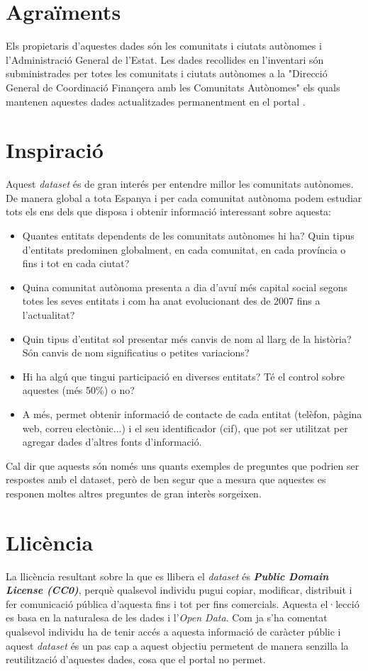 \documentclass[12pt]{article}
\begin{document}
\section*{Agraïments}
Els propietaris d'aquestes dades són les comunitats i ciutats autònomes i l'Administració General de l'Estat. Les dades recollides en l'inventari són subministrades per totes les comunitats i ciutats autònomes a la "Direcció General de Coordinació Finançera amb les Comunitats Autònomes" els quals mantenen aquestes dades actualitzades permanentment en el portal \cite{PDFAjuda}.

\section*{Inspiració}
Aquest \textit{dataset} és de gran interés per entendre millor les comunitats autònomes. De manera global a tota Espanya i per cada comunitat autònoma podem estudiar tots els ens dels que disposa i obtenir informació interessant sobre aquesta:
\begin{itemize}
    \item Quantes entitats dependents de les comunitats autònomes hi ha? Quin tipus d'entitats predominen globalment, en cada comunitat, en cada província o fins i tot en cada ciutat?
    \item Quina comunitat autònoma presenta a dia d'avuí més capital social segons totes les seves entitats i com ha anat evolucionant des de 2007 fins a l'actualitat?
    \item Quin tipus d'entitat sol presentar més canvis de nom al llarg de la història? Són canvis de nom significatius o petites variacions?
    \item Hi ha algú que tingui participació en diverses entitats? Té el control sobre aquestes (més 50\%) o no?
    \item A més, permet obtenir informació de contacte de cada entitat (telèfon, pàgina web, correu electònic...) i el seu identificador (cif), que pot ser utilitzat per agregar dades d'altres fonts d'informació.
\end{itemize}

Cal dir que aquests són només uns quants exemples de preguntes que podrien ser respostes amb el dataset, però de ben segur que a mesura que aquestes es responen moltes altres preguntes de gran interès sorgeixen.


\section*{Llicència}
La llicència resultant sobre la que es llibera el \textit{dataset} és \textit{\textbf{Public Domain License (CC0)}}, perquè qualsevol individu pugui copiar, modificar, distribuit i fer comunicació pública d'aquesta fins i tot per fins comercials.
Aquesta el·lecció es basa en la naturalesa de les dades i l'\textit{Open Data}. Com ja s'ha comentat qualsevol individu ha de tenir accés a aquesta informació de caràcter públic i aquest \textit{dataset} és un pas cap a aquest objectiu permetent de manera senzilla la reutilització d'aquestes dades, cosa que el portal no permet.
\end{document}
